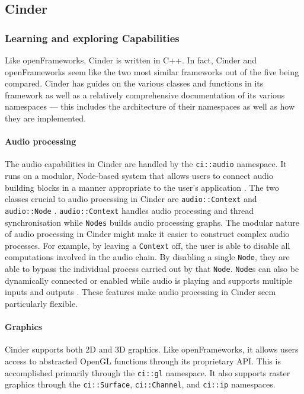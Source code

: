 \documentclass[../../initial_thesis.tex]{subfiles}
\begin{document}
\subsection{Cinder}\label{sec:cinder}

\subsubsection{Learning and exploring Capabilities}
Like openFrameworks, Cinder is written in C++. In fact, Cinder and openFrameworks seem like the two most similar frameworks out of the five being compared. Cinder has guides on the various classes and functions in its framework as well as a relatively comprehensive documentation of its various namespaces --- this includes the architecture of their namespaces as well as how they are implemented.

\paragraph{Audio processing}
The audio capabilities in Cinder are handled by the \verb|ci::audio| namespace. It runs on a modular, Node-based system that allows users to connect audio building blocks in a manner appropriate to the user's application \cite{CinderAudioAPI}. The two classes crucial to audio processing in Cinder are \verb|audio::Context| and \verb|audio::Node| \cite{CinderAudioAPI}. \verb|audio::Context| handles audio processing and thread synchronisation while \verb|Nodes| builds audio processing graphs. The modular nature of audio processing in Cinder might make it easier to construct complex audio processes. For example, by leaving a \verb|Context| off, the user is able to disable all computations involved in the audio chain. By disabling a single \verb|Node|, they are able to bypass the individual process carried out by that \verb|Node|. \verb|Node|s can also be dynamically connected or enabled while audio is playing and supports multiple inputs and outputs \cite{CinderAudioAPI}. These features make audio processing in Cinder seem particularly flexible.

\paragraph{Graphics}
Cinder supports both 2D and 3D graphics. Like openFrameworks, it allows users access to abstracted OpenGL functions through its proprietary API. This is accomplished primarily through the \verb|ci::gl| namespace. It also supports raster graphics through the \verb|ci::Surface|, \verb|ci::Channel|, and \verb|ci::ip| namespaces.
\end{document}
